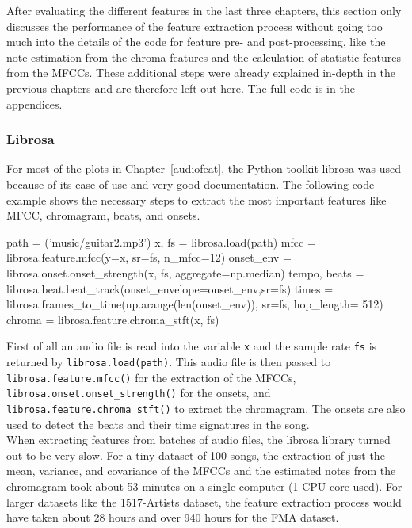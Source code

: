 After evaluating the different features in the last three chapters, this section only discusses the performance of the feature extraction process without going too much into the details of the code for feature pre- and post-processing, like the note estimation from the chroma features and the calculation of statistic features from the MFCCs. These additional steps were already explained in-depth in the previous chapters and are therefore left out here. The full code is in the appendices. 

\subsubsection{Librosa}

For most of the plots in Chapter~\ref{audiofeat}, the Python toolkit librosa was used because of its ease of use and very good documentation. The following code example shows the necessary steps to extract the most important features like MFCC, chromagram, beats, and onsets.
\lstset{language=Python} 
\begin{pythonCode}[frame=single,label={lst:Librosa},caption={Librosa},captionpos=b]
path = ('music/guitar2.mp3')
x, fs = librosa.load(path)
mfcc = librosa.feature.mfcc(y=x, sr=fs, n_mfcc=12)
onset_env = librosa.onset.onset_strength(x, fs, aggregate=np.median)
tempo, beats = librosa.beat.beat_track(onset_envelope=onset_env,sr=fs)
times = librosa.frames_to_time(np.arange(len(onset_env)), sr=fs, hop_length= 512)
chroma = librosa.feature.chroma_stft(x, fs)
\end{pythonCode}	

\noindent First of all an audio file is read into the variable \lstinline{x} and the sample rate \lstinline{fs} is returned by \lstinline{librosa.load(path)}. This audio file is then passed to \lstinline{librosa.feature.mfcc()} for the extraction of the MFCCs, \lstinline{librosa.onset.onset_strength()} for the onsets, and \lstinline{librosa.feature.chroma_stft()} to extract the chromagram. The onsets are also used to detect the beats and their time signatures in the song.\\
When extracting features from batches of audio files, the librosa library turned out to be very slow. For a tiny dataset of 100 songs, the extraction of just the mean, variance, and covariance of the MFCCs and the estimated notes from the chromagram took about 53 minutes on a single computer (1 CPU core used). 
For larger datasets like the 1517-Artists dataset, the feature extraction process would have taken about 28 hours and over 940 hours for the FMA dataset. 

